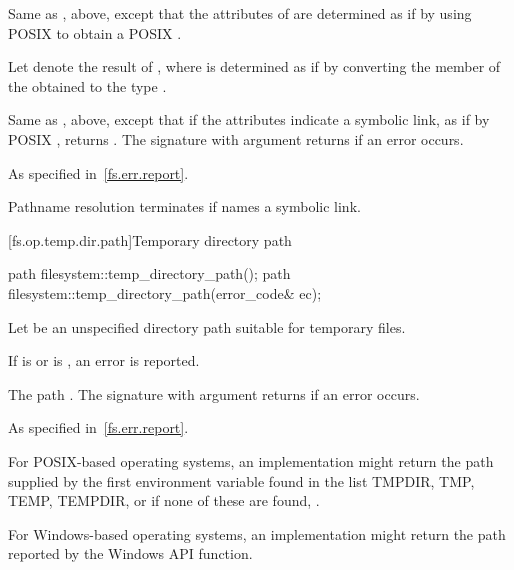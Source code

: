 \begin{itemdescr}
\pnum
\effects
Same as , above,
  except that the attributes
    of  are determined as if by using POSIX 
    to obtain a POSIX .

\pnum
Let  denote the result of ,
where  is determined as if by converting the  member
of the obtained  to the type .

\pnum
\returns
Same as , above, except
      that if the attributes indicate a symbolic link, as if by POSIX ,
      returns .
      The signature with argument  returns
       if an error occurs.

\pnum
\throws
As specified in~\ref{fs.err.report}.

\pnum
\remarks
Pathname resolution terminates if  names a symbolic link.
\end{itemdescr}


[fs.op.temp.dir.path]{Temporary directory path}

%
\begin{itemdecl}
path filesystem::temp_directory_path();
path filesystem::temp_directory_path(error_code& ec);
\end{itemdecl}

\begin{itemdescr}
\pnum
Let  be an unspecified directory path suitable for temporary files.

\pnum
\effects
If  is  or  is
  , an error is reported.

\pnum
\returns
The path .
  The signature with argument  returns  if an
  error occurs.

\pnum
\throws
As specified in~\ref{fs.err.report}.

\pnum
\begin{example}
For POSIX-based operating systems, an implementation might
  return the path
  supplied by the first environment variable found in the list TMPDIR, TMP, TEMP, TEMPDIR,
  or if none of these are found, .

For Windows-based operating systems, an implementation might return the path
  reported by the Windows  API function.
\end{example}
\end{itemdescr}

